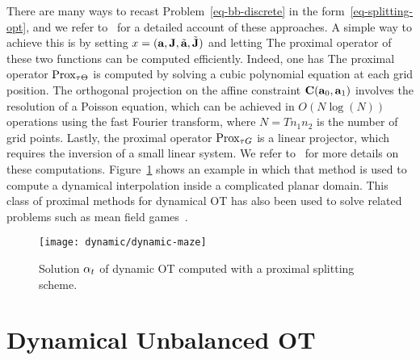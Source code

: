 There are many ways to recast Problem~\eqref{eq-bb-discrete} in the form~\eqref{eq-splitting-opt}, and we refer to~\citep{FPapPeyOud13} for a detailed account of these approaches. A simple way to achieve this is by setting $x=(\mathrm{\textbf{a}},\mathrm{\textbf{J}},\tilde{\mathrm{\textbf{a}}},\tilde{\mathrm{\textbf{J}}})$ and letting
%
The proximal operator of these two functions can be computed efficiently.
% 
Indeed, one has
The proximal operator $\operatorname{Prox}_{\tau\Theta}$ is computed by solving a cubic polynomial equation at each grid position. The orthogonal projection on the affine constraint $\mathrm{\textbf{C}}(\mathrm{\textbf{a}}_0,\mathrm{\textbf{a}}_1)$ involves the resolution of a Poisson equation, which can be achieved in $O(N\log(N))$ operations using the fast Fourier transform, where $N=Tn_1 n_2$ is the number of grid points.
%
Lastly, the proximal operator $\operatorname{Prox}_{\tau G}$ is a linear projector, which requires the inversion of a small linear system.
%
We refer to~\citet{FPapPeyOud13} for more details on these computations. 
%
Figure~\ref{fig-dynamic-maze} shows an example in which that method is used to compute a dynamical interpolation inside a complicated planar domain. 
%
This class of proximal methods for dynamical OT has also been used to solve related problems such as mean field games~\citep{benamou2015augmented}.

\begin{figure}[h!]
\centering
\texttt{[image: dynamic/dynamic-maze]}
\caption{\label{fig-dynamic-maze}
Solution $\alpha_t$ of dynamic OT computed with a proximal splitting scheme.
}
\end{figure}



\section{Dynamical Unbalanced OT}
\label{dynamic-unbalanced}

